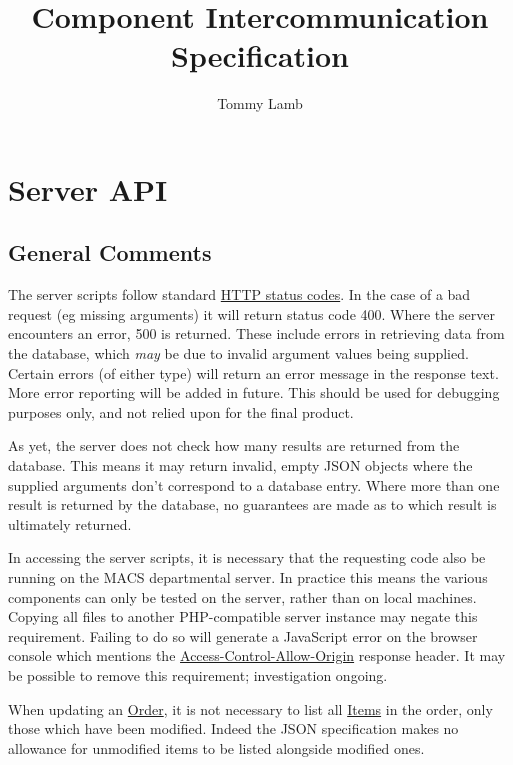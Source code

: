 \documentclass[12pt, a4paper]{article}
\begin{document}
\title{Component Intercommunication Specification}
\author{Tommy Lamb}

\maketitle

\tableofcontents
\pagebreak


\section{Server API}

\subsection{General Comments}

The server scripts follow standard \href{https://en.wikipedia.org/wiki/List_of_HTTP_status_codes}{HTTP status codes}. In the case of a bad request (eg missing arguments) it will return status code 400. Where the server encounters an error, 500 is returned. These include errors in retrieving data from the database, which \textit{may} be due to invalid argument values being supplied.
Certain errors (of either type) will return an error message in the response text. More error reporting will be added in future. This should be used for debugging purposes only, and not relied upon for the final product.

As yet, the server does not check how many results are returned from the database. This means it may return invalid, empty JSON objects where the supplied arguments don't correspond to a database entry. Where more than one result is returned by the database, no guarantees are made as to which result is ultimately returned.

In accessing the server scripts, it is necessary that the requesting code also be running on the MACS departmental server. In practice this means the various components can only be tested on the server, rather than on local machines. Copying all files to another PHP-compatible server instance may negate this requirement. Failing to do so will generate a JavaScript error on the browser console which mentions the \href{https://developer.mozilla.org/en-US/docs/Web/HTTP/Headers/Access-Control-Allow-Origin}{Access-Control-Allow-Origin} response header. It may be possible to remove this requirement; investigation ongoing.

When updating an \hyperref[subsec:Order]{Order}, it is not necessary to list all \hyperref[subsubsec:OrderItem]{Items} in the order, only those which have been modified. Indeed the JSON specification makes no allowance for unmodified items to be listed alongside modified ones.
\end{document}
